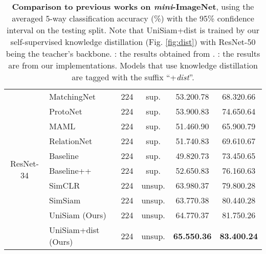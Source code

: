 \documentclass[runningheads]{llncs}
\begin{document}
\begin{table}[tbp]
{{\begin{tabular}{clcccc}
      \multirow{ 10}{*}{ResNet-34}                 & MatchingNet\textsuperscript{} \cite{vinyals2016matching}                & 224 & sup.    &  53.200.78  & 68.320.66 \\
                       & ProtoNet\textsuperscript{} \cite{snell2017prototypical}                 & 224 & sup.    &  53.900.83  & 74.650.64 \\
                       & MAML\textsuperscript{} \cite{finn2017model}                             & 224 & sup.    &  51.460.90  & 65.900.79 \\
                       & RelationNet\textsuperscript{} \cite{sung2018learning}                   & 224 & sup.    &  51.740.83  & 69.610.67 \\
                       & Baseline \cite{chen2019a}                             & 224 & sup.    &  49.820.73  & 73.450.65 \\
              & Baseline++ \cite{chen2019a}                           & 224 & sup.    &  52.650.83  & 76.160.63 \\
     \cmidrule(r){2-6}
                       & SimCLR\textsuperscript{} \cite{chen2020a}                               & 224 & unsup.  & 63.980.37 & 79.800.28 \\
                       & SimSiam\textsuperscript{} \cite{chen2020exploring}                               & 224 & unsup.  & 63.770.38 &80.440.28 \\
     \cmidrule(r){2-6}
                       & UniSiam (Ours)                                        & 224 & unsup.  & 64.770.37 & 81.750.26   \\
                       & UniSiam+dist (Ours)                                   & 224 & unsup.  & \textbf{65.550.36} & \textbf{83.400.24} \\
    \bottomrule
  \end{tabular}
}}
    \caption{\label{tab:sota_mini} \textbf{Comparison to previous works on \emph{mini}-ImageNet}, using the averaged 5-way classification accuracy (\%) with the 95\% confidence interval on the testing split. Note that UniSiam+dist is trained by our self-supervised knowledge distillation (Fig. \ref{fig:dist}) with ResNet-50 being the teacher's backbone. : the results obtained from \cite{chen2019a}. : the results are from our implementations. Models that use knowledge distillation are tagged with the suffix ``+\emph{dist}''.}
\end{table}
\end{document}
